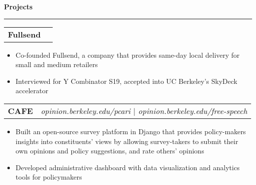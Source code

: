 \documentclass[11pt,letterpaper]{article}
\makeatletter
\newenvironment{topic}[1]
    {
    {\Large \centerline{#1}}
    \vspace*{0.03in}
    \hrule 
    \vspace*{0.05in}
    }
    {}
\newenvironment{event}
    {
    \begin{tabular*}{\textwidth}{l@{\extracolsep{\fill}}r}
    }
    {
    \end{tabular*}
    }
\makeatother
\begin{document}
    \begin{topic}{\textbf{Projects}}
        \begin{event}
            \textbf{Fullsend}
        \end{event}
            \begin{itemize}
                \item Co-founded Fullsend, a company that provides same-day local delivery for small and medium retailers
                \item Interviewed for Y Combinator S19, accepted into UC Berkeley's SkyDeck accelerator
            \end{itemize}

        \begin{event}
            \textbf{CAFE} & \emph{opinion.berkeley.edu/pcari $\vert$ opinion.berkeley.edu/free-speech}
        \end{event}
            \begin{itemize}
                \item Built an open-source survey platform in Django that provides policy-makers insights into constituents' views by allowing survey-takers to submit their own opinions and policy suggestions, and rate others' opinions
                \item Developed administrative dashboard with data visualization and analytics tools for policymakers
            \end{itemize}



\end{topic}
\end{document}
